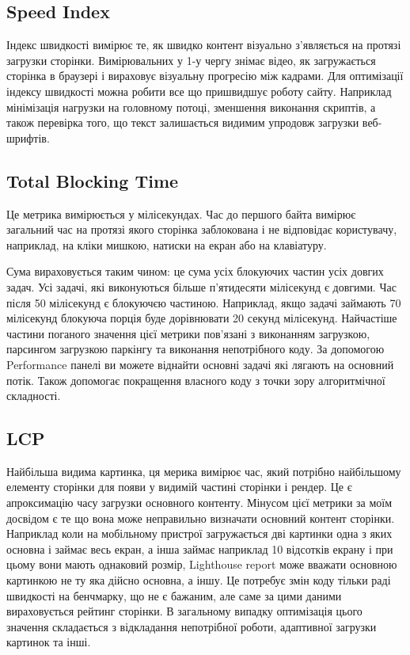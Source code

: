 \subsection{Speed Index}
Індекс швидкості вимірює те, як швидко контент візуально з'являється на протязі загрузки сторінки.
Вимірювальних у 1-у чергу знімає відео, як загружається сторінка в браузері і вираховує візуальну прогресію між кадрами.
Для оптимізації індексу швидкості можна робити все що пришвидшує роботу сайту.
Наприклад мінімізація нагрузки на головному потоці, зменшення виконання скриптів, а також перевірка того,
що текст залишається видимим упродовж загрузки веб-шрифтів.

\subsection{Total Blocking Time}
Це метрика вимірюється у мілісекундах. Час до першого байта вимірює загальний час на протязі якого сторінка заблокована
і не відповідає користувачу, наприклад, на кліки мишкою, натиски на екран або на клавіатуру.

Сума вираховується таким чином: це сума усіх блокуючих частин усіх довгих задач.
Усі задачі, які виконуються більше п'ятидесяти мілісекунд є довгими.
Час після 50 мілісекунд є блокуючєю частиною.
Наприклад, якщо задачі займають 70 мілісекунд блокуюча порція буде дорівнювати 20 секунд мілісекунд.
Найчастіше частини поганого значення цієї метрики пов'язані з виконанням загрузкою, парсингом загрузкою паркінгу та виконання непотрібного коду.
За допомогою Performance панелі ви можете віднайти основні задачі які лягають на основний потік.
Також допомогає покращення власного коду з точки зору алгоритмічної складності.

\subsection{LCP}
Найбільша видима картинка, ця мерика вимірює час, який потрібно найбільшому елементу сторінки для появи у видимій частині сторінки і рендер.
Це є апроксимацію часу загрузки основного контенту. Мінусом цієї метрики за моїм досвідом є те що вона може неправильно визначати основний контент сторінки.
Наприклад коли на мобільному пристрої загружається дві картинки одна з яких основна і займає весь екран, а інша займає наприклад 10 відсотків екрану і при цьому вони мають однаковий розмір, Lighthouse report може вважати основною картинкою не ту яка дійсно основна, а іншу.
Це потребує змін коду тільки раді швидкості на бенчмарку, що не є бажаним, але саме за цими даними вираховується рейтинг сторінки.
В загальному випадку оптимізація цього значення складається з відкладання непотрібної роботи, адаптивної загрузки картинок та інші.

